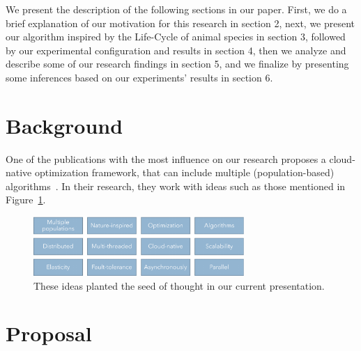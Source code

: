 \documentclass[runningheads]{llncs}
\begin{document}
We present the description of the following sections in our paper. First, we do
a brief explanation of our motivation for this research in section 2, next, we
present our algorithm inspired by the Life-Cycle of animal species in section
3, followed by our experimental configuration and results in section 4, then we
analyze and describe some of our research findings in section 5, and we
finalize by presenting some inferences based on our experiments' results in
section 6.

\section{Background}


One of the publications with the most influence on our research proposes a
cloud-native optimization framework, that can include multiple
(population-based) algorithms~\cite{valdez2021container}. In their research,
they work with ideas such as those mentioned in Figure~\ref{fig1}.

\begin{figure}
    \centering
    \includegraphics[width=80mm]{img/fig1_background.pdf}
    \caption{These ideas planted the seed of thought in our current presentation.} \label{fig1}
    \end{figure}

\section{Proposal} 
\end{document}

